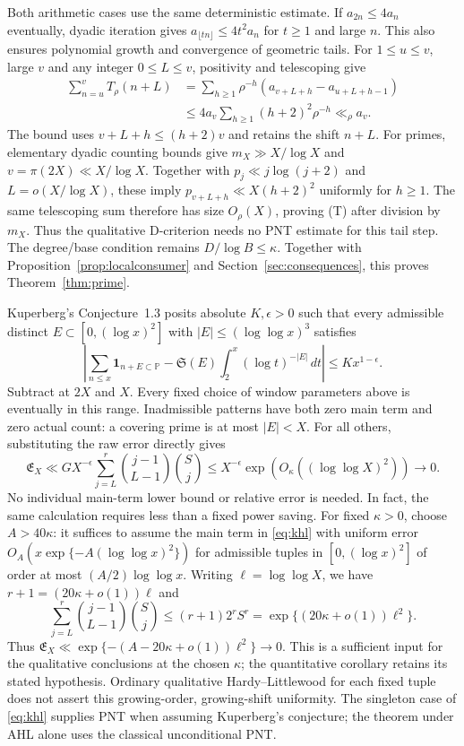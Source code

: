 \documentclass[11pt,a4paper]{article}
\newcommand{\ind}{\mathbf 1}
\begin{document}
Both arithmetic cases use the same deterministic estimate. If
$a_{2n}\le4a_n$ eventually, dyadic iteration gives
$a_{\lfloor tn\rfloor}\le4t^2a_n$ for $t\ge1$ and large $n$.
This also ensures polynomial growth and convergence of geometric tails.
For $1\le u\le v$, large $v$ and any integer $0\le L\le v$,
positivity and telescoping give
\begin{equation}\label{eq:tailmass}
 \begin{aligned}
 \sum_{n=u}^vT_\rho(n+L)
   &=\sum_{h\ge1}\rho^{-h}
                (a_{v+L+h}-a_{u+L+h-1})\\
   &\le4a_v\sum_{h\ge1}(h+2)^2\rho^{-h}\ll_\rho a_v.
 \end{aligned}
\end{equation}
The bound uses $v+L+h\le(h+2)v$ and retains the shift $n+L$.
For primes, elementary dyadic counting bounds give
$m_X\gg X/\log X$ and $v=\pi(2X)\ll X/\log X$.
Together with $p_j\ll j\log(j+2)$ and $L=o(X/\log X)$, these imply
$p_{v+L+h}\ll X(h+2)^2$ uniformly for $h\ge1$.
The same telescoping sum therefore has size $O_\rho(X)$, proving
(T) after division by $m_X$. Thus the qualitative D-criterion needs
no PNT estimate for this tail step. The degree/base condition remains
$D/\log B\le\kappa$.
Together with Proposition~\ref{prop:localconsumer} and
Section~\ref{sec:consequences}, this proves Theorem~\ref{thm:prime}.

Kuperberg's Conjecture~1.3 \cite[Conjecture 1.3, equation (7)]{kuperberg}
posits absolute $K,\epsilon>0$ such that every admissible distinct
$E\subset[0,(\log x)^2]$ with $|E|\le(\log\log x)^3$ satisfies
\begin{equation}\label{eq:khl}
 \left|\sum_{n\le x}\ind_{n+E\subset\mathbb P}
      -\mathfrak S(E)\int_2^x(\log t)^{-|E|}\,dt\right|
                   \le Kx^{1-\epsilon}.
\end{equation}
Subtract at $2X$ and $X$. Every fixed choice of window parameters above is eventually in
this range. Inadmissible patterns have both zero main term and zero
actual count: a covering prime is at most $|E|<X$.
For all others, substituting the raw error directly gives
\[
 \mathfrak E_X\ll GX^{-\epsilon}
      \sum_{j=L}^r\binom{j-1}{L-1}\binom Sj
   \le X^{-\epsilon}\exp(O_\kappa((\log\log X)^2))\longrightarrow0.
\]
No individual main-term lower bound or relative error is needed.
In fact, the same calculation requires less than a fixed power saving.
For fixed $\kappa>0$, choose $A>40\kappa$: it suffices to assume the
main term in \eqref{eq:khl} with uniform error
$O_A(x\exp\{-A(\log\log x)^2\})$ for admissible tuples in
$[0,(\log x)^2]$ of order at most $(A/2)\log\log x$.
Writing $\ell=\log\log X$, we have $r+1=(20\kappa+o(1))\ell$ and
\[
 \sum_{j=L}^r\binom{j-1}{L-1}\binom Sj
 \le(r+1)2^rS^r=\exp\{(20\kappa+o(1))\ell^2\}.
\]
Thus $\mathfrak E_X\ll\exp\{-(A-20\kappa+o(1))\ell^2\}\to0$.
This is a sufficient input for the qualitative conclusions at the
chosen $\kappa$; the quantitative corollary retains its stated hypothesis.
Ordinary qualitative Hardy--Littlewood for each fixed tuple does not
assert this growing-order, growing-shift uniformity. The singleton
case of \eqref{eq:khl} supplies PNT when assuming Kuperberg's conjecture;
the theorem under AHL alone uses the classical unconditional PNT.
\end{document}
